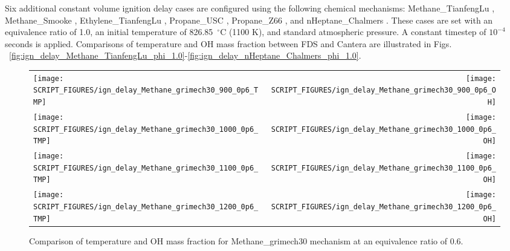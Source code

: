 \documentclass[11pt]{book}
\begin{document}
Six additional constant volume ignition delay cases are configured using the following chemical mechanisms: Methane\_TianfengLu \cite{TianfengLu:2008}, Methane\_Smooke \cite{Smooke:1995}, Ethylene\_TianfengLu \cite{Luo:2012}, Propane\_USC \cite{Qin:20001}, Propane\_Z66 \cite{Zettervall2017}, and nHeptane\_Chalmers \cite{Tao:2007}. These cases are set with an equivalence ratio of 1.0, an initial temperature of 826.85~$^\circ$C (1100 K), and standard atmospheric pressure. A constant timestep of $10^{-4}$ seconds is applied. Comparisons of temperature and OH mass fraction between FDS and Cantera are illustrated in Figs. ~\ref{fig:ign_delay_Methane_TianfengLu_phi_1.0}-\ref{fig:ign_delay_nHeptane_Chalmers_phi_1.0}.

\begin{figure}[p]
\begin{tabular*}{\textwidth}{lr}
\texttt{[image: SCRIPT\_FIGURES/ign\_delay\_Methane\_grimech30\_900\_0p6\_TMP]} &
\texttt{[image: SCRIPT\_FIGURES/ign\_delay\_Methane\_grimech30\_900\_0p6\_OH]} \\
\texttt{[image: SCRIPT\_FIGURES/ign\_delay\_Methane\_grimech30\_1000\_0p6\_TMP]} &
\texttt{[image: SCRIPT\_FIGURES/ign\_delay\_Methane\_grimech30\_1000\_0p6\_OH]} \\
\texttt{[image: SCRIPT\_FIGURES/ign\_delay\_Methane\_grimech30\_1100\_0p6\_TMP]} &
\texttt{[image: SCRIPT\_FIGURES/ign\_delay\_Methane\_grimech30\_1100\_0p6\_OH]} \\
\texttt{[image: SCRIPT\_FIGURES/ign\_delay\_Methane\_grimech30\_1200\_0p6\_TMP]} &
\texttt{[image: SCRIPT\_FIGURES/ign\_delay\_Methane\_grimech30\_1200\_0p6\_OH]}
\end{tabular*}
\caption[Results of the  test cases]{Comparison of temperature and OH mass fraction for Methane\_grimech30 mechanism at an equivalence ratio of 0.6.}
\label{fig:ign_delay_Methane_grimech30_phi_0.6}
\end{figure}
\end{document}
